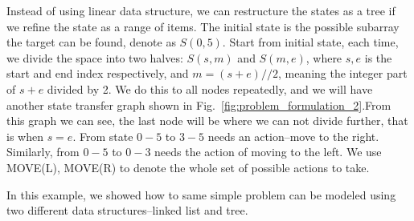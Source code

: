 \documentclass[../main.tex]{subfiles}
\begin{document}
Instead of using linear data structure, we can restructure the states as a tree if we refine the state as a range of items. The initial state  is the possible subarray the target can be found, denote as $S(0, 5)$. Start from initial state, each time, we divide the space into two halves: $S(s, m)$ and $S(m, e)$, where $s, e$ is the start and end index respectively, and $m=(s+e)//2$, meaning the integer part of $s+e$ divided by 2. We do this to all nodes repeatedly, and we will have another state transfer graph shown in Fig.~\ref{fig:problem_formulation_2}.From this graph we can see, the last node will be where we can not divide further, that is when $s=e$. From state $0-5$ to $3-5$ needs an action--move to the right. Similarly, from $0-5$ to $0-3$ needs the action of moving to the left.  We use {MOVE(L), MOVE(R)} to denote the whole set of possible actions to take.

In this example, we showed how to same simple problem can be modeled using two different data structures--linked list and tree. 







\end{document}
